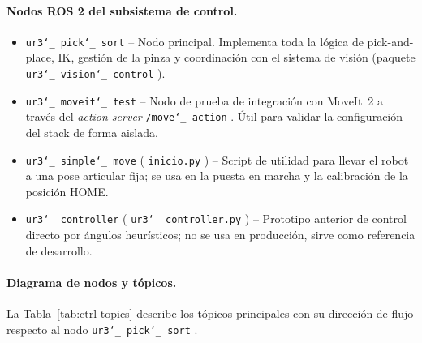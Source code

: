 \documentclass[12pt,a4paper]{article}
\newcommand{\code}[1]{%
  \begingroup
  \def\_{\char`_\penalty0 }%
  \def\/{\char`/\penalty0 }%
  \texttt{\small #1}%
  \endgroup}
\begin{document}
\paragraph{Nodos ROS 2 del subsistema de control.}
\begin{itemize}
  \item \code{ur3\_pick\_sort} -- Nodo principal. Implementa toda la lógica de pick-and-place, IK, gestión
        de la pinza y coordinación con el sistema de visión (paquete \code{ur3\_vision\_control}).
  \item \code{ur3\_moveit\_test} -- Nodo de prueba de integración con MoveIt~2 a través del \textit{action
        server} \code{/move\_action}. Útil para validar la configuración del stack de forma aislada.
  \item \code{ur3\_simple\_move} (\code{inicio.py}) -- Script de utilidad para llevar el robot a una pose
        articular fija; se usa en la puesta en marcha y la calibración de la posición HOME.
  \item \code{ur3\_controller} (\code{ur3\_controller.py}) -- Prototipo anterior de control directo por
        ángulos heurísticos; no se usa en producción, sirve como referencia de desarrollo.
\end{itemize}

\paragraph{Diagrama de nodos y tópicos.}
La Tabla~\ref{tab:ctrl-topics} describe los tópicos principales con su dirección de flujo respecto al
nodo \code{ur3\_pick\_sort}.
\end{document}
